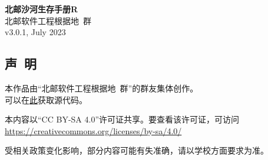 \documentclass[a4paper]{article}
\begin{document}


\begin{titlepage}
    \centering
    {\Huge\rmfamily\bfseries 北邮沙河生存手册R} \\[6.5ex]
    {\Large\sffamily 北邮软件工程根据地\ 群} \\
    {\large\ttfamily v3.0.1, July 2023}\\[1.5ex]
\end{titlepage}

\begin{titlepage}
    \begin{center}
        \section*{声\ 明}

        本作品由“北邮软件工程根据地\ 群”的群友集体创作。\\
        可以在\href{https://github.com/BUPTSE/welcome}{此}获取源代码。

        \medskip

        本内容以“CC BY-SA 4.0”许可证共享。要查看该许可证，可访问\\
        \href{https://creativecommons.org/licenses/by-sa/4.0/}{https://creativecommons.org/licenses/by-sa/4.0/}

        \medskip

        受相关政策变化影响，部分内容可能有失准确，请以学校方面要求为准。

        \bigskip

    \end{center}

    \tableofcontents
\end{titlepage}

\pagestyle{fancy}
\lhead{\small \leftmark}
\chead{}
\lfoot{}
\cfoot{\thepage}
\rfoot{}
\renewcommand{\headrulewidth}{0.4pt}




















\end{document}
